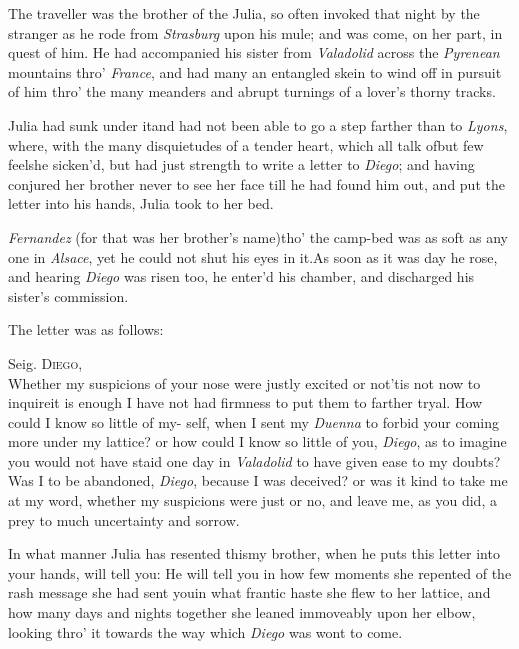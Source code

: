 \documentclass{article}
\begin{document}
The traveller was the brother of the Julia, so often
invoked that night by the stranger as he rode from \textit{Strasburg}
upon his mule; and was come, on her part,\break 
in quest of him. He had accompanied\break
his sister from \textit{Valadolid} across the
\textit{Pyrenean} mountains thro’ \textit{France}, and had\break
many an entangled skein to wind off in pursuit of him thro’ the many
meanders and abrupt turnings of a lover’s thorny tracks.

\tsk Julia had sunk under it\tsk and had
not been able to go a step farther than to \textit{Lyons}, where,
with the many disquietudes of a tender heart, which all talk
of\tsk but few feel\tsk she sicken’d, but had just
strength to write a letter to \textit{Diego}; and having conjured her
brother never to see her face till he had found him out, and put
the letter into his hands, Julia took to her bed.

\textit{Fernandez} (for that was her brother’s
name)\tsh tho’ the camp-bed was as soft as any one
in \textit{Alsace}, yet he could not shut his eyes in
it.\tsk As soon as it was day he rose, and hearing
\textit{Diego} was risen too,\break
he enter’d his chamber, and discharged his
sister’s commission.

The letter was as follows:

\indent\quad Seig. \textsc{Diego},\\
\indent\lqq Whether my suspicions of your nose\break
\lqq were justly excited or not\tsk ’tis not now\break
\lqq to inquire\tsk it is enough I have not\break
\lqq had firmness to put them to farther\break
\lqq tryal.\break
\break
\indent\lqq How could I know so little of my-\break
\lqq self, when I sent my \textit{Duenna} to forbid\break
\lqq your coming more under my lattice?\break
\lqq or how could I know so little of you,\break
\lqq \textit{Diego}, as to imagine you would not\break
\lqq have staid one day in \textit{Valadolid} to have\break
\lqq given ease to my doubts?\tsk Was I to\break
\lqq be abandoned, \textit{Diego}, because I was\break
\lqq deceived? or was it kind to take me\break
\lqq at my word, whether my suspicions\break
\lqq were just or no, and leave me, as you\break
\lqq did, a prey to much uncertainty and\break
\lqq sorrow.

\indent\lqq In what manner Julia has resented\break
\lqq this\tsk my brother, when he puts this\break
\lqq letter into your hands, will tell you:\break
\lqq He will tell you in how few moments\break
\lqq she repented of the rash message she\break
\lqq had sent you\tsk in what frantic haste\break
\lqq she flew to her lattice, and how many\break
\lqq days and nights together she leaned\break
\lqq immoveably upon her elbow, looking\break
\lqq thro’ it towards the way which \textit{Diego}\break
\lqq was wont to come.\hfill
\end{document}
